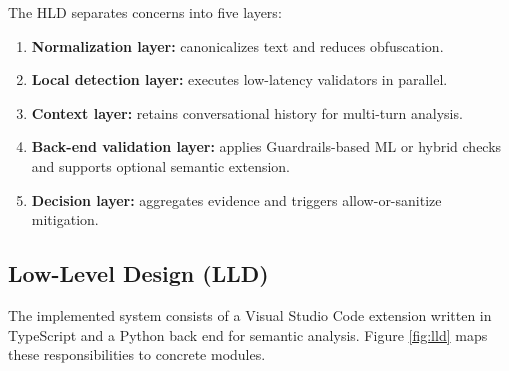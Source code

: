\documentclass[journal]{IEEEtran}
\begin{document}
The HLD separates concerns into five layers:
\begin{enumerate}
    \item \textbf{Normalization layer:} canonicalizes text and reduces obfuscation.
    \item \textbf{Local detection layer:} executes low-latency validators in parallel.
    \item \textbf{Context layer:} retains conversational history for multi-turn analysis.
    \item \textbf{Back-end validation layer:} applies Guardrails-based ML or hybrid checks and supports optional semantic extension.
    \item \textbf{Decision layer:} aggregates evidence and triggers allow-or-sanitize mitigation.
\end{enumerate}

\subsection{Low-Level Design (LLD)}
The implemented system consists of a Visual Studio Code extension written in TypeScript and a Python back end for semantic analysis. Figure \ref{fig:lld} maps these responsibilities to concrete modules.
\end{document}

